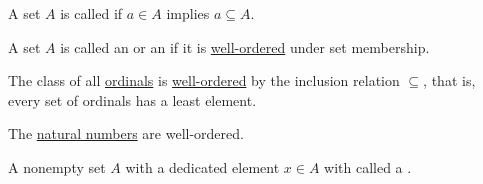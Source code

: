 \begin{definition}\label{def:transitive_set}
  A set \( A \) is called  if \( a \in A \) implies \( a \subseteq A \).
\end{definition}

\medskip

\begin{definition}\label{def:ordinal}
  A set \( A \) is called an  or an  if it is \hyperref[def:well_ordered_set]{well-ordered} under set membership.
\end{definition}

\begin{theorem}\label{thm:ordinals_are_well_ordered}
  The class of all \hyperref[def:ordinal]{ordinals} is \hyperref[def:well_ordered_set]{well-ordered} by the inclusion relation \( \subseteq \), that is, every set of ordinals has a least element.
\end{theorem}

\begin{corollary}\label{thm:natural_numbers_are_well_ordered}
  The \hyperref[def:natural_numbers]{natural numbers} are well-ordered.
\end{corollary}

\begin{definition}\label{def:pointed_set}
  A nonempty set \( A \) with a dedicated element \( x \in A \) with called a .
\end{definition}
